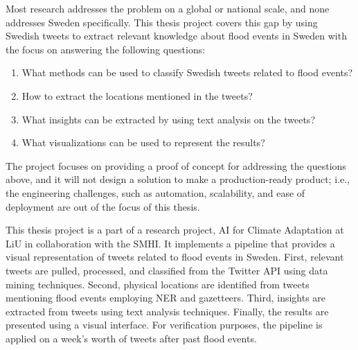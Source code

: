 Most research addresses the problem on a global or national scale, and none addresses Sweden
specifically. This thesis project covers this gap by using Swedish tweets to extract relevant
knowledge about flood events in Sweden with the focus on answering the following questions:
\begin{enumerate} 
  \item What methods can be used to classify Swedish tweets related to flood events?
  \item How to extract the locations mentioned in the tweets? 
  \item What insights can be extracted by using text analysis on the tweets?
  \item What visualizations can be used to represent the results? 
\end{enumerate}

The project focuses on providing a proof of concept for addressing the questions above, and it will
not design a solution to make a production-ready product; i.e., the engineering challenges, such as
automation, scalability, and ease of deployment are out of the focus of this thesis. 

This thesis project is a part of a research project, AI for Climate Adaptation
\cite{nesetAI4ClimateAdaptation} at \ac{LiU} in collaboration with the \ac{SMHI}. It implements a
pipeline that provides a visual representation of tweets related to flood events in Sweden. First,
relevant tweets are pulled, processed, and classified from the Twitter API using data mining
techniques. Second, physical locations are identified from tweets mentioning flood events employing
\ac{NER} and gazetteers. Third, insights are extracted from tweets using text analysis techniques.
Finally, the results are presented using a visual interface. For verification purposes, the pipeline
is applied on a week's worth of tweets after past flood events.
